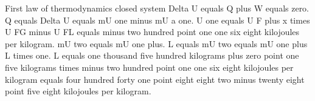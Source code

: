 First law of thermodynamics closed system Delta U equals Q plus W equals zero. Q equals Delta U equals mU one minus mU a one. U one equals U F plus x times U FG minus U FL equals minus two hundred point one one six eight kilojoules per kilogram. mU two equals mU one plus. L equals mU two equals mU one plus L times one. L equals one thousand five hundred kilograms plus zero point one five kilograms times minus two hundred point one one six eight kilojoules per kilogram equals four hundred forty one point eight eight two minus twenty eight point five eight kilojoules per kilogram.